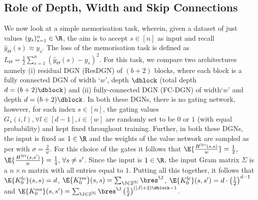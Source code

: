 \subsection{Role of Depth, Width and Skip Connections}\label{sec:mem}
We now look at a simple memorisation task, wherein, given a dataset of just values $(y_s)_{s=1}^n\in  \R$, the aim is to accept $s\in[n]$ as input and recall $\hat{y}_{\Theta}(s)\approx y_s$. The loss of the memorisation task is defined as $L_{\Theta}=\frac{1}{2}\sum_{s=1}^n (\hat{y}_{\Theta}(s)-y_s)^2$. For this task, we compare two architectures namely (i) residual DGN (ResDGN) of $(b+2)$ blocks, where each block is a fully connected DGN of width `$w$', depth $\dblock$ (total depth $d=(b+2)\dblock$) and (ii) fully-connected DGN (FC-DGN) of width`$w$' and depth $d=(b+2)\dblock$. In both these DGNs, there is no gating network, however, for each index $s\in[n]$, the gating values $G_{s}(i,l),\forall l\in[d-1], i\in[w] $ are randomly set to be $0$ or $1$ (with equal probability) and kept fixed throughout training. Further, in both these DGNs, the input is fixed as $1\in\R$ and the weights of the value network are sampled as per  with $\sigma=\frac{2}{w}$. 
For this choice of the gates it follows that $\E{\frac{H^{\text{lyr}}(s,s)}{w}}=\frac{1}{2}$, $\E{\frac{H^{\text{lyr}}(s,s')}{w}}=\frac{1}{4},\,\forall s\neq s'$. Since the input is $1\in\R$, the input Gram matrix $\Sigma$ is a $n\times n$ matrix with all entries equal to $1$. Putting all this together, it follows that $\E{K^{\text{fc}}_0}(s,s)=d$,  $\E{K^{\text{res}}_0}(s,s)=\sum_{\J\in 2^{[b]}}  \bres^{\J}$, $\E{K^{\text{fc}}_0}(s,s')=d\cdot\left(\frac{1}2\right)^{d-1}$ and $\E{K^{\text{res}}_0}(s,s')=\sum_{\J\in 2^{[b]}}  \bres^{\J}\left(\frac{1}2\right)^{(|J|+2)\dblock-1}$.

